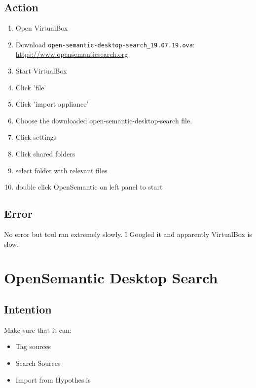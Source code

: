 \documentclass{article}
\begin{document}
\subsection{Action}
\begin{enumerate}
    \item Open VirtualBox
    \item Download \verb|open-semantic-desktop-search_19.07.19.ova|: \href{https://www.opensemanticsearch.org}{https://www.opensemanticsearch.org}
    \item Start VirtualBox 
    \item Click 'file'
    \item Click 'import appliance'
    \item Choose the downloaded open-semantic-desktop-search file.
    \item Click settings 
    \item Click shared folders 
    \item select folder with relevant files
    \item double click OpenSemantic on left panel to start
\end{enumerate}
\subsection{Error}
No error but tool ran extremely slowly. I Googled it and apparently VirtualBox is slow.

\section{OpenSemantic Desktop Search}
\subsection{Intention}
Make sure that it can:
\begin{itemize}
    \item Tag sources
    \item Search Sources
    \item Import from Hypothes.is
\end{itemize}
\end{document}
